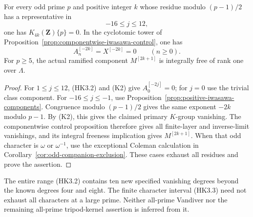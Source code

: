 \begin{corollary}
\label{cor:twelve-degrees-period}
For every odd prime $p$ and positive integer $k$ whose residue
modulo $(p-1)/2$ has a representative in
\[
                             -16\leq j\leq12,
 \tag{HK3.3}
\]
one has $K_{4k}(\mathbf Z)\{p\}=0$.
In the cyclotomic tower of
Proposition~\ref{prop:componentwise-iwasawa-control}, one has
\[
              A_n^{[-2k]}=X^{[-2k]}=0\qquad(n\geq0).
\]
For $p\geq5$, the actual ramified component $M^{[2k+1]}$
is integrally free of rank one over $\Lambda$.
\end{corollary}

\begin{proof}
For $1\leq j\leq12$, (HK3.2) and (K2) give
$A_0^{[-2j]}=0$; for $j=0$ use the trivial class component.
For $-16\leq j\leq-1$, use
Proposition~\ref{prop:positive-iwasawa-components}.
Congruence modulo $(p-1)/2$ gives the same exponent $-2k$
modulo $p-1$. By (K2), this gives the claimed primary
$K$-group vanishing. The componentwise control proposition therefore
gives all finite-layer and inverse-limit vanishings, and its
integral freeness implication gives $M^{[2k+1]}$.
When that odd character is $\omega$ or $\omega^{-1}$, use
the exceptional Coleman calculation in
Corollary~\ref{cor:odd-companion-exclusion}. These cases
exhaust all residues and prove the assertion.
\end{proof}

The entire range (HK3.2) contains ten new specified vanishing
degrees beyond the known degrees four and eight. The finite
character interval (HK3.3) need not exhaust all characters at
a large prime. Neither all-prime Vandiver nor the remaining
all-prime tripod-kernel assertion is inferred from it.
